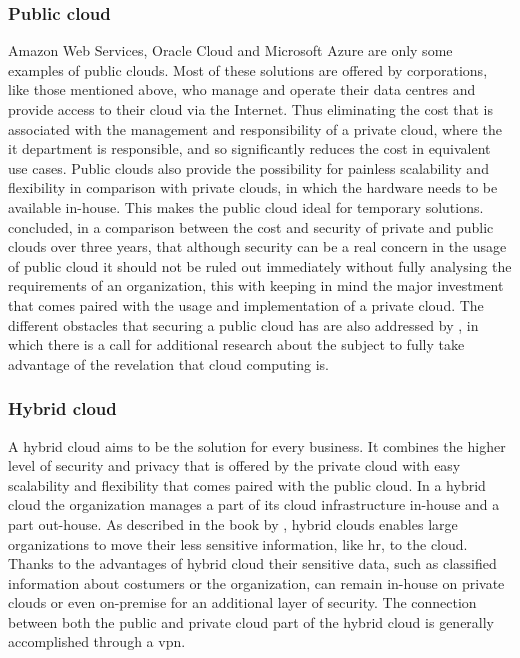 \subsubsection{Public cloud}
Amazon Web Services, Oracle Cloud and Microsoft Azure are only some examples of public clouds. Most of these solutions are offered by corporations, like those mentioned above, who manage and operate their data centres and provide access to their cloud via the Internet. Thus eliminating the cost that is associated with the management and responsibility of a private cloud, where the \acrshort{it} department is responsible, and so significantly reduces the cost in equivalent use cases. Public clouds also provide the possibility for painless scalability and flexibility in comparison with private clouds, in which the hardware needs to be available in-house. This makes the public cloud ideal for temporary solutions.
\newline
\textcite{Singh2012} concluded, in a comparison between the cost and security of private and public clouds over three years, that although security can be a real concern in the usage of public cloud it should not be ruled out immediately without fully analysing the requirements of an organization, this with keeping in mind the major investment that comes paired with the usage and implementation of a private cloud.  
The different obstacles that securing a public cloud has are also addressed by \textcite{Ren2012}, in which there is a call for additional research about the subject to fully take advantage of the revelation that cloud computing is. 

\subsubsection{Hybrid cloud}
A hybrid cloud aims to be the solution for every business. It combines the higher level of security and privacy that is offered by the private cloud with easy scalability and flexibility that comes paired with the public cloud. In a hybrid cloud the organization manages a part of its cloud infrastructure in-house and a part out-house. As described in the book by \textcite{Sarna2010}, hybrid clouds enables large organizations to move their less sensitive information, like \acrfull{hr}, to the cloud. Thanks to the advantages of hybrid cloud their sensitive data, such as classified information about costumers or the organization, can remain in-house on private clouds or even on-premise for an additional layer of security. The connection between both the public and private cloud part of the hybrid cloud is generally accomplished through a \acrfull{vpn}.

